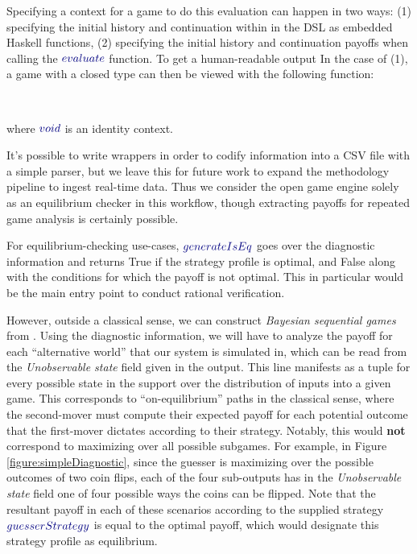 \documentclass[11pt,titlepage,dvipsnames,table,xcdraw,english]{article}
\newcommand{\Varid}[1]{\mathit{#1}}
\def\resethooks{%
  \global\let\SaveRestoreHook\empty
  \global\let\ColumnHook\empty}
\newcommand{\hsindent}[1]{\quad}%
\let\hspre\empty
\let\hspost\empty
\renewcommand{\Varid}[1]{{\color{typeColor}{#1}}}
\begin{document}
Specifying a context for a game to do this evaluation can happen in two ways: (1) specifying the initial history and continuation within in the DSL as embedded Haskell functions, (2) specifying the initial history and continuation payoffs when calling the \ensuremath{\Varid{evaluate}} function. To get a human-readable output In the case of (1), a game with a closed type can then be viewed with the following function: 

\begin{hscode}\SaveRestoreHook
\column{B}{@{}>{\hspre}l<{\hspost}@{}}%
\column{4}{@{}>{\hspre}l<{\hspost}@{}}%
\column{E}{@{}>{\hspre}l<{\hspost}@{}}%
\>[B]{}\Varid{runDiagnostics}\mathrel{=}\Varid{generateOutput}\mathbin{\$}{}\<[E]%
\\
\>[B]{}\hsindent{4}{}\<[4]%
\>[4]{}\Varid{evaluate}\;\Varid{myClosedGame}\;\Varid{myStrategy}\;\Varid{void}{}\<[E]%
\ColumnHook
\end{hscode}\resethooks
where \ensuremath{\Varid{void}} is an identity context. 

It's possible to write wrappers in order to codify information into a CSV file with a simple parser, but we leave this for future work to expand the methodology pipeline to ingest real-time data. Thus we consider the open game engine solely as an equilibrium checker in this workflow, though extracting payoffs for repeated game analysis is certainly possible. 

For equilibrium-checking use-cases, \ensuremath{\Varid{generateIsEq}} goes over the diagnostic information and returns True if the strategy profile is optimal, and False along with the conditions for which the payoff is not optimal. This in particular would be the main entry point to conduct rational verification. 


However, outside a classical sense, we can construct \textit{Bayesian sequential games} from \cite[Example 7.7.1.4]{BoltThesis}. Using the diagnostic information, we will have to analyze the payoff for each ``alternative world'' that our system is simulated in, which can be read from the \textit{Unobservable state} field given in the output. This line manifests as a tuple for every possible state in the support over the distribution of inputs into a given game. This corresponds to ``on-equilibrium'' paths in the classical sense, where the second-mover must compute their expected payoff for each potential outcome that the first-mover dictates according to their strategy. Notably, this would \textbf{not} correspond to maximizing over all possible subgames. For example, in Figure \ref{figure:simpleDiagnostic}, since the guesser is maximizing over the possible outcomes of two coin flips, each of the four sub-outputs has in the \textit{Unobservable state} field one of four possible ways the coins can be flipped. Note that the resultant payoff in each of these scenarios according to the supplied strategy \ensuremath{\Varid{guesserStrategy}} is equal to the optimal payoff, which would designate this strategy profile as equilibrium.  
\end{document}
